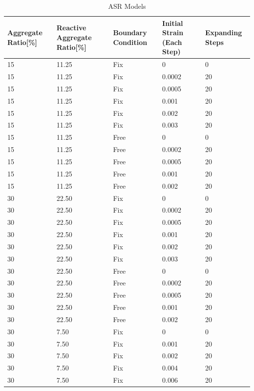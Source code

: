 \begin{table}[ht!]
\centering
\begin{tabular}{ ||p{2cm}|p{2cm}|p{2cm}|p{2cm}|p{2cm}|| }
 \hline
 Aggregate Ratio[\%] &  Reactive Aggregate Ratio[\%] & Boundary Condition & Initial Strain (Each Step) & Expanding Steps \\ [0.5ex]
 \hline\hline
 15 & 11.25 & Fix & 0 & 0 \\
 15 & 11.25 & Fix & 0.0002 & 20 \\
 15 & 11.25 & Fix & 0.0005 & 20 \\
 15 & 11.25 & Fix & 0.001 & 20 \\
 15 & 11.25 & Fix & 0.002 & 20 \\
 15 & 11.25 & Fix & 0.003 & 20 \\

 15 & 11.25 & Free & 0 & 0 \\
 15 & 11.25 & Free & 0.0002 & 20 \\
 15 & 11.25 & Free & 0.0005 & 20 \\
 15 & 11.25 & Free & 0.001 & 20 \\
 15 & 11.25 & Free & 0.002 & 20 \\

 30 & 22.50 & Fix & 0 & 0 \\
 30 & 22.50 & Fix & 0.0002 & 20 \\
 30 & 22.50 & Fix & 0.0005 & 20 \\
 30 & 22.50 & Fix & 0.001 & 20 \\
 30 & 22.50 & Fix & 0.002 & 20 \\
 30 & 22.50 & Fix & 0.003 & 20 \\

 30 & 22.50 & Free & 0 & 0 \\
 30 & 22.50 & Free & 0.0002 & 20 \\
 30 & 22.50 & Free & 0.0005 & 20 \\
 30 & 22.50 & Free & 0.001 & 20 \\
 30 & 22.50 & Free & 0.002 & 20 \\

 30 & 7.50 & Fix & 0 & 0 \\
 30 & 7.50 & Fix & 0.001 & 20 \\
 30 & 7.50 & Fix & 0.002 & 20 \\
 30 & 7.50 & Fix & 0.004 & 20 \\
 30 & 7.50 & Fix & 0.006 & 20 \\  [0.5ex]
 \hline
\end{tabular}
\caption{ASR Models}
\label{table:ASR_MODELS}
\end{table}

